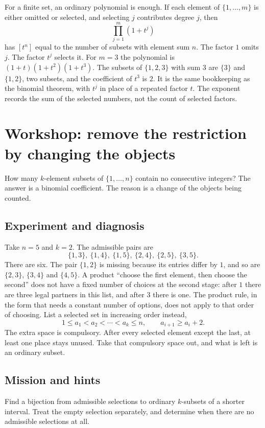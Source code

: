 For a finite set, an ordinary polynomial is enough. If each element of $\{1,\dots,m\}$ is either omitted or selected, and selecting $j$ contributes degree $j$, then
\[
\prod_{j=1}^m(1+t^j)
\]
has $[t^n]$ equal to the number of subsets with element sum $n$. The factor $1$ omits $j$. The factor $t^j$ selects it. For $m=3$ the polynomial is $(1+t)(1+t^2)(1+t^3)$. The subsets of $\{1,2,3\}$ with sum $3$ are $\{3\}$ and $\{1,2\}$, two subsets, and the coefficient of $t^3$ is $2$. It is the same bookkeeping as the binomial theorem, with $t^j$ in place of a repeated factor $t$. The exponent records the sum of the selected numbers, not the count of selected factors.

\section{Workshop: remove the restriction by changing the objects}
How many $k$-element subsets of $\{1,\dots,n\}$ contain no consecutive integers? The answer is a binomial coefficient. The reason is a change of the objects being counted.

\subsection*{Experiment and diagnosis}
Take $n=5$ and $k=2$. The admissible pairs are
\[
\{1,3\},\ \{1,4\},\ \{1,5\},\ \{2,4\},\ \{2,5\},\ \{3,5\}.
\]
There are six. The pair $\{1,2\}$ is missing because its entries differ by $1$, and so are $\{2,3\}$, $\{3,4\}$ and $\{4,5\}$. A product ``choose the first element, then choose the second'' does not have a fixed number of choices at the second stage: after $1$ there are three legal partners in this list, and after $3$ there is one. The product rule, in the form that needs a constant number of options, does not apply to that order of choosing. List a selected set in increasing order instead,
\[
1\le a_1<a_2<\cdots<a_k\le n,\qquad a_{i+1}\ge a_i+2.
\]
The extra space is compulsory. After every selected element except the last, at least one place stays unused. Take that compulsory space out, and what is left is an ordinary subset.

\subsection*{Mission and hints}
Find a bijection from admissible selections to ordinary $k$-subsets of a shorter interval. Treat the empty selection separately, and determine when there are no admissible selections at all.

